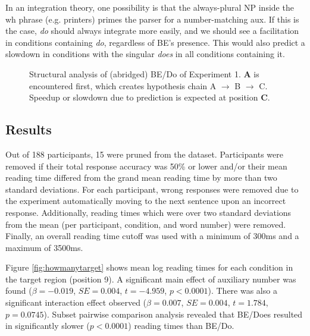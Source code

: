 \documentclass[12pt]{article}
\begin{document}
In an integration theory, one possibility is that the always-plural NP inside the wh phrase (e.g. printers) primes the parser for a number-matching aux. If this is the case, \textit{do} should always integrate more easily, and we should see a facilitation in conditions containing \textit{do}, regardless of BE's presence. This would also predict a slowdown in conditions with the singular \textit{does} in all conditions containing it.

\begin{figure}[h!]
    \centering
    \caption{Structural analysis of (abridged) BE/Do of
        Experiment 1. \textbf{A} is encountered first,
        which creates hypothesis chain A $\rightarrow$ B $\rightarrow$ C.
        Speedup or slowdown due to prediction is expected at position \textbf{C}.}
    \label{fig:printers}
\end{figure}

\subsection{Results}
Out of 188 participants, 15 were pruned from the dataset. Participants were removed if their total response accuracy was 50\% or lower and/or their mean reading time differed from the grand mean reading time by
more than two standard deviations. For each participant, wrong responses were removed due to the experiment
automatically moving to the next sentence upon an incorrect response. Additionally, reading times which were over two standard deviations from the mean (per participant, condition, and word number) were removed. Finally, an overall
reading time cutoff was used with a minimum of 300ms and a maximum of 3500ms.

Figure \ref{fig:howmanytarget} shows mean log reading times for each condition in the target region (position 9).
A significant main effect of auxiliary number was found ($\beta=-0.019$, $SE=0.004$, $t=-4.959$, $p < 0.0001$).
There was also a significant interaction effect observed ($\beta=0.007$, $SE=0.004$, $t=1.784$, $p=0.0745$). Subset pairwise comparison analysis revealed that BE/Does resulted in significantly
slower ($p < 0.0001$) reading times than BE/Do.
\end{document}
